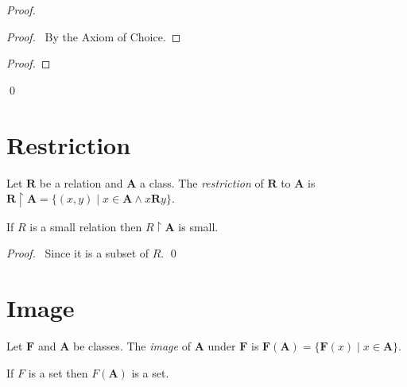 \begin{proof}
    \pf
    \begin{proof}
        \pf\ By the Axiom of Choice.
    \end{proof}
    \begin{proof}
    \end{proof}
    \qed
\end{proof}

\section{Restriction}

\begin{definition}
    Let $\mathbf{R}$ be a relation and $\mathbf{A}$ a class. 
    The \emph{restriction} of $\mathbf{R}$ to $\mathbf{A}$
    is $\mathbf{R} \restriction \mathbf{A} = 
    \{ (x,y) \mid x \in \mathbf{A} \wedge x\mathbf{R}y \}$.
\end{definition}

\begin{theorem}
    If $R$ is a small relation then $R \restriction \mathbf{A}$ is small.    
\end{theorem}

\begin{proof}
    \pf\ Since it is a subset of $R$. \qed
\end{proof}

\section{Image}

\begin{definition}
    Let $\mathbf{F}$ and $\mathbf{A}$ be classes. The \emph{image} of $\mathbf{A}$
    under $\mathbf{F}$ is $\mathbf{F}(\mathbf{A}) = \{ \mathbf{F}(x) \mid x \in \mathbf{A} \}$.
\end{definition}

\begin{theorem}
    If $F$ is a set then $F(\mathbf{A})$ is a set.
\end{theorem}

